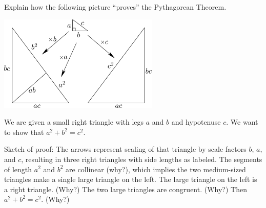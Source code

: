 \documentclass[nooutcomes]{ximera}
\begin{document}
\begin{question}
Explain how the following picture ``proves'' the Pythagorean Theorem.
\begin{image}
\includegraphics[width=3in]{pbpdilation.png}
\end{image}
\begin{freeResponse}
\end{freeResponse}
\begin{hint}
We are given a small right triangle with legs $a$ and $b$ and hypotenuse $c$.  We want to show that $a^2 + b^2 = c^2$.  

Sketch of proof:  The arrows represent scaling of that triangle by scale factors $b$, $a$, and $c$, resulting in three right triangles with side lengths as labeled.  The segments of length $a^2$ and $b^2$ are collinear (why?), which implies the two medium-sized triangles make a single large triangle on the left.  The large triangle on the left is a right triangle.  (Why?)  The two large triangles are congruent.  (Why?)  Then $a^2 + b^2 = c^2$.  (Why?)
\end{hint}
\end{question}
\end{document}
